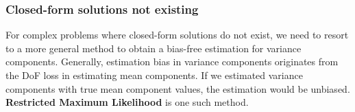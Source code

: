 \documentclass[12pt]{article}
\begin{document}
\subsubsection{Closed-form solutions not existing}
    For complex problems where closed-form solutions do not exist, we
need to resort to a more general method to obtain a bias-free estimation for variance components. Generally, estimation bias in variance components originates from the DoF loss in estimating mean components. If we estimated variance components with true mean component values, the estimation would be unbiased. \textbf{Restricted Maximum Likelihood} is one such method.
\end{document}
